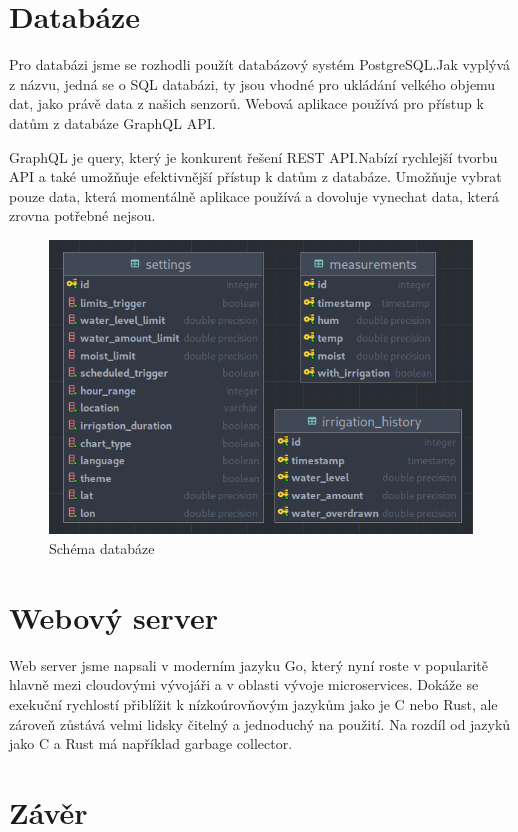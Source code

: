 \documentclass[12pt,a4paper]{article}
\begin{document}
\clearpage

\section{Databáze}

Pro databázi jsme se rozhodli použít databázový systém PostgreSQL.\@ Jak
vyplývá
z názvu, jedná se o SQL databázi, ty jsou vhodné pro ukládání velkého objemu
dat, jako právě data z našich senzorů. Webová aplikace používá pro přístup k
datům z databáze GraphQL API.\@

GraphQL je query, který je konkurent řešení REST API.\@ Nabízí rychlejší
tvorbu API a také umožňuje efektivnější přístup k datům z databáze. Umožňuje
vybrat pouze data, která momentálně aplikace používá a dovoluje vynechat data,
která zrovna potřebné nejsou.

\begin{figure}[h]
	\centering
	\includegraphics[width=0.9\linewidth]{db.png}
	\caption{Schéma databáze}
\end{figure}

\section{Webový server}

Web server jsme napsali v moderním jazyku Go, který nyní roste v popularitě
hlavně mezi cloudovými vývojáři a v oblasti vývoje microservices. Dokáže se
exekuční rychlostí přiblížit k nízkoúrovňovým jazykům jako je C nebo Rust, ale
zároveň zůstává velmi lidsky čitelný a jednoduchý na použití. Na rozdíl od
jazyků jako C a Rust má například garbage collector.

\section{Závěr}
\end{document}
